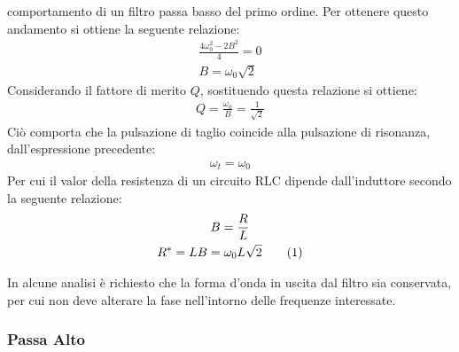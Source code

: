 \documentclass{article}
\newcommand{\tageq}{\tag{\stepcounter{equation}\theequation}}
\numberwithin{equation}{subsection}
\begin{document}
comportamento di un filtro passa basso del primo ordine. Per ottenere questo andamento si ottiene la seguente relazione: 
\begin{gather*}
    \displaystyle\frac{4\omega_0^2-2B^2}{4}=0\\
    B=\omega_0\sqrt{2}
\end{gather*}
Considerando il fattore di merito $Q$, sostituendo questa relazione si ottiene:
\begin{gather*}
    Q=\displaystyle\frac{\omega_0}{B}=\frac{1}{\sqrt2}
\end{gather*}
Ciò comporta che la pulsazione di taglio coincide alla pulsazione di risonanza, dall'espressione precedente:
\begin{gather*}
    \omega_t=\omega_0
\end{gather*}
Per cui il valor della resistenza di un circuito RLC dipende dall'induttore secondo la seguente relazione:
\begin{gather*}
    B=\displaystyle\frac{R}{L}\\
    R^*=LB=\omega_0L\sqrt2\tageq
\end{gather*}

In alcune analisi è richiesto che la forma d'onda in uscita dal filtro sia conservata, per cui non deve alterare la fase nell'intorno delle frequenze 
interessate. 

\subsubsection{Passa Alto}
\end{document}
